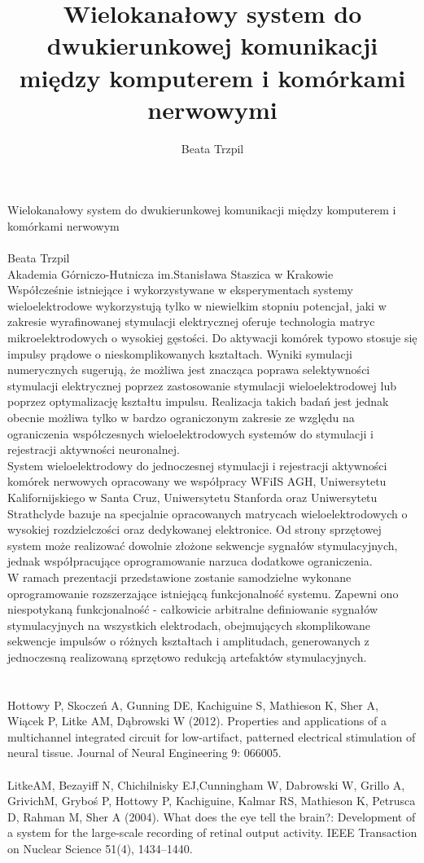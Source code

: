 \documentclass[12pt,a4paper]{article}
\author{Beata Trzpil}
\title{Wielokanałowy system do dwukierunkowej komunikacji między komputerem i komórkami nerwowymi}
\begin{document}
Wielokanałowy system do dwukierunkowej komunikacji między komputerem i komórkami nerwowym
\\ \\
Beata Trzpil
\\
Akademia Górniczo-Hutnicza im.Stanisława Staszica w Krakowie
\\

Współcześnie istniejące i wykorzystywane w eksperymentach systemy wieloelektrodowe wykorzystują tylko w niewielkim stopniu potencjał, jaki w zakresie wyrafinowanej stymulacji elektrycznej oferuje technologia matryc mikroelektrodowych o wysokiej gęstości. Do aktywacji komórek typowo stosuje się impulsy prądowe o nieskomplikowanych kształtach. Wyniki symulacji numerycznych sugerują, że możliwa jest znacząca poprawa selektywności stymulacji elektrycznej poprzez zastosowanie stymulacji wieloelektrodowej lub poprzez optymalizację kształtu impulsu. 
Realizacja takich badań jest jednak obecnie możliwa tylko w bardzo ograniczonym zakresie ze względu na ograniczenia współczesnych wieloelektrodowych systemów do stymulacji i rejestracji aktywności neuronalnej. 
\\
System wieloelektrodowy do jednoczesnej stymulacji i rejestracji aktywności komórek nerwowych opracowany we współpracy WFiIS AGH, Uniwersytetu Kalifornijskiego w Santa Cruz, Uniwersytetu Stanforda oraz Uniwersytetu Strathclyde bazuje na specjalnie opracowanych matrycach wieloelektrodowych o wysokiej rozdzielczości oraz dedykowanej elektronice. Od strony sprzętowej system może realizować dowolnie złożone sekwencje sygnałów stymulacyjnych, jednak współpracujące oprogramowanie narzuca dodatkowe ograniczenia. 
\\
W ramach prezentacji przedstawione zostanie samodzielne wykonane  oprogramowanie rozszerzające istniejącą funkcjonalność systemu. Zapewni ono niespotykaną funkcjonalność  - całkowicie arbitralne definiowanie sygnałów stymulacyjnych na wszystkich elektrodach, obejmujących skomplikowane sekwencje impulsów o różnych kształtach i amplitudach, generowanych z jednoczesną realizowaną sprzętowo redukcją artefaktów stymulacyjnych. 
\\ \\ \\
Hottowy P, Skoczeń A, Gunning DE, Kachiguine S, Mathieson K, Sher A, Wiącek P, Litke AM, Dąbrowski W (2012). Properties and applications of a multichannel integrated circuit for low-artifact, patterned electrical stimulation of neural tissue. Journal of Neural Engineering 9: 066005.
\\ \\LitkeAM, Bezayiff N, Chichilnisky EJ,Cunningham W, Dabrowski W, Grillo A, GrivichM, Gryboś P, Hottowy P, Kachiguine, Kalmar RS, Mathieson K, Petrusca D, Rahman M, Sher A (2004). What does the eye tell the brain?: Development of a system for the large-scale recording of retinal output activity. IEEE Transaction on Nuclear Science 51(4), 1434–1440.
\end{document}
